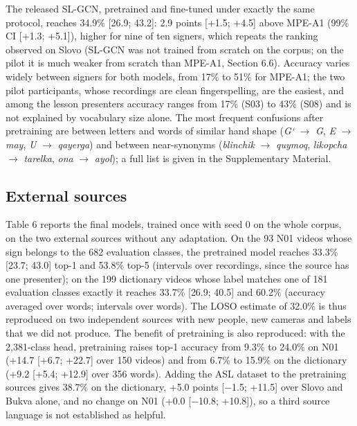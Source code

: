 \documentclass[a4paper,fleqn]{cas-dc}
\begin{document}
The released SL-GCN, pretrained and fine-tuned under exactly the same protocol, reaches 34.9\% {[}26.9; 43.2{]}: 2.9 points {[}+1.5; +4.5{]} above MPE-A1 (99\% CI {[}+1.3; +5.1{]}), higher for nine of ten signers, which repeats the ranking observed on Slovo (SL-GCN was not trained from scratch on the corpus; on the pilot it is much weaker from scratch than MPE-A1, Section 6.6). Accuracy varies widely between signers for both models, from 17\% to 51\% for MPE-A1; the two pilot participants, whose recordings are clean fingerspelling, are the easiest, and among the lesson presenters accuracy ranges from 17\% (S03) to 43\% (S08) and is not explained by vocabulary size alone. The most frequent confusions after pretraining are between letters and words of similar hand shape (\emph{G‘} $\rightarrow$ \emph{G}, \emph{E} $\rightarrow$ \emph{may}, \emph{U} $\rightarrow$ \emph{qayerga}) and between near-synonyms (\emph{blinchik} $\rightarrow$ \emph{quymoq}, \emph{likopcha} $\rightarrow$ \emph{tarelka}, \emph{ona} $\rightarrow$ \emph{ayol}); a full list is given in the Supplementary Material.

\hypertarget{external-sources-1}{%
\subsection{External sources}\label{external-sources-1}}

Table 6 reports the final models, trained once with seed 0 on the whole corpus, on the two external sources without any adaptation. On the 93 N01 videos whose sign belongs to the 682 evaluation classes, the pretrained model reaches 33.3\% {[}23.7; 43.0{]} top-1 and 53.8\% top-5 (intervals over recordings, since the source has one presenter); on the 199 dictionary videos whose label matches one of 181 evaluation classes exactly it reaches 33.7\% {[}26.9; 40.5{]} and 60.2\% (accuracy averaged over words; intervals over words). The LOSO estimate of 32.0\% is thus reproduced on two independent sources with new people, new cameras and labels that we did not produce. The benefit of pretraining is also reproduced: with the 2,381-class head, pretraining raises top-1 accuracy from 9.3\% to 24.0\% on N01 (+14.7 {[}+6.7; +22.7{]} over 150 videos) and from 6.7\% to 15.9\% on the dictionary (+9.2 {[}+5.4; +12.9{]} over 356 words). Adding the ASL dataset to the pretraining sources gives 38.7\% on the dictionary, +5.0 points {[}$-$1.5; +11.5{]} over Slovo and Bukva alone, and no change on N01 (+0.0 {[}$-$10.8; +10.8{]}), so a third source language is not established as helpful.
\end{document}
